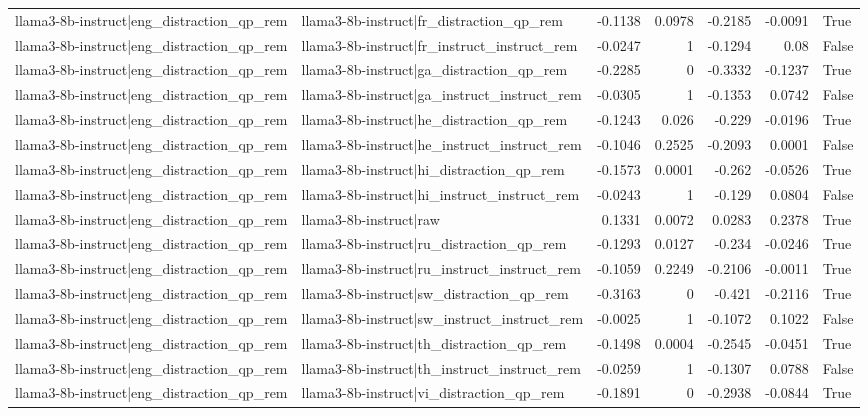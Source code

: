\begin{table}
\begin{tabular}{l l r r r r l}
llama3-8b-instruct|eng_distraction_qp_rem & llama3-8b-instruct|fr_distraction_qp_rem & -0.1138 & 0.0978 & -0.2185 & -0.0091 & True \\
llama3-8b-instruct|eng_distraction_qp_rem & llama3-8b-instruct|fr_instruct_instruct_rem & -0.0247 & 1 & -0.1294 & 0.08 & False \\
llama3-8b-instruct|eng_distraction_qp_rem & llama3-8b-instruct|ga_distraction_qp_rem & -0.2285 & 0 & -0.3332 & -0.1237 & True \\
llama3-8b-instruct|eng_distraction_qp_rem & llama3-8b-instruct|ga_instruct_instruct_rem & -0.0305 & 1 & -0.1353 & 0.0742 & False \\
llama3-8b-instruct|eng_distraction_qp_rem & llama3-8b-instruct|he_distraction_qp_rem & -0.1243 & 0.026 & -0.229 & -0.0196 & True \\
llama3-8b-instruct|eng_distraction_qp_rem & llama3-8b-instruct|he_instruct_instruct_rem & -0.1046 & 0.2525 & -0.2093 & 0.0001 & False \\
llama3-8b-instruct|eng_distraction_qp_rem & llama3-8b-instruct|hi_distraction_qp_rem & -0.1573 & 0.0001 & -0.262 & -0.0526 & True \\
llama3-8b-instruct|eng_distraction_qp_rem & llama3-8b-instruct|hi_instruct_instruct_rem & -0.0243 & 1 & -0.129 & 0.0804 & False \\
llama3-8b-instruct|eng_distraction_qp_rem & llama3-8b-instruct|raw & 0.1331 & 0.0072 & 0.0283 & 0.2378 & True \\
llama3-8b-instruct|eng_distraction_qp_rem & llama3-8b-instruct|ru_distraction_qp_rem & -0.1293 & 0.0127 & -0.234 & -0.0246 & True \\
llama3-8b-instruct|eng_distraction_qp_rem & llama3-8b-instruct|ru_instruct_instruct_rem & -0.1059 & 0.2249 & -0.2106 & -0.0011 & True \\
llama3-8b-instruct|eng_distraction_qp_rem & llama3-8b-instruct|sw_distraction_qp_rem & -0.3163 & 0 & -0.421 & -0.2116 & True \\
llama3-8b-instruct|eng_distraction_qp_rem & llama3-8b-instruct|sw_instruct_instruct_rem & -0.0025 & 1 & -0.1072 & 0.1022 & False \\
llama3-8b-instruct|eng_distraction_qp_rem & llama3-8b-instruct|th_distraction_qp_rem & -0.1498 & 0.0004 & -0.2545 & -0.0451 & True \\
llama3-8b-instruct|eng_distraction_qp_rem & llama3-8b-instruct|th_instruct_instruct_rem & -0.0259 & 1 & -0.1307 & 0.0788 & False \\
llama3-8b-instruct|eng_distraction_qp_rem & llama3-8b-instruct|vi_distraction_qp_rem & -0.1891 & 0 & -0.2938 & -0.0844 & True \\

\end{tabular}
\end{table}
